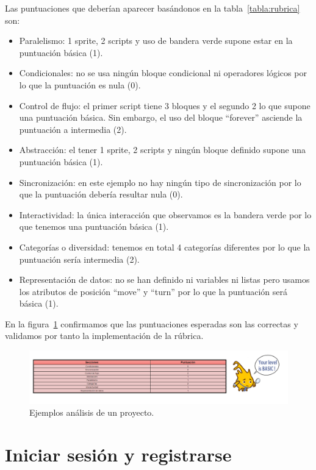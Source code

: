 \documentclass[a4paper, 12pt]{book}
\begin{document}
    Las puntuaciones que deberían aparecer basándonos en la tabla~\ref{tabla:rubrica} son:
    \begin{itemize}
        \item Paralelismo: 1 sprite, 2 scripts y uso de bandera verde supone estar en la puntuación básica (1).
        \item Condicionales: no se usa ningún bloque condicional ni operadores lógicos por lo que la puntuación es nula (0).
        \item Control de flujo: el primer script tiene 3 bloques y el segundo 2 lo que supone una puntuación básica. Sin embargo, el uso del bloque ``forever'' asciende la puntuación a intermedia (2).
        \item Abstracción: el tener 1 sprite, 2 scripts y ningún bloque definido supone una puntuación básica (1).
        \item Sincronización: en este ejemplo no hay ningún tipo de sincronización por lo que la puntuación debería resultar nula (0).
        \item Interactividad: la única interacción que observamos es la bandera verde por lo que tenemos una puntuación básica (1).
        \item Categorías o diversidad: tenemos en total 4 categorías diferentes por lo que la puntuación sería intermedia (2).
        \item Representación de datos: no se han definido ni variables ni listas pero usamos los atributos de posición ``move'' y ``turn'' por lo que la puntuación será básica (1).
    \end{itemize}
En la figura~\ref{figura:analisis-ej} confirmamos que las puntuaciones esperadas son las correctas y validamos por tanto la implementación de la rúbrica.
\begin{figure}[h]
            \centering
            \includegraphics[scale=0.37]{img/validacion-ej.PNG}
            \caption{Ejemplos análisis de un proyecto.}
            \label{figura:analisis-ej}
        \end{figure}
        
\section{Iniciar sesión y registrarse}
\end{document}
